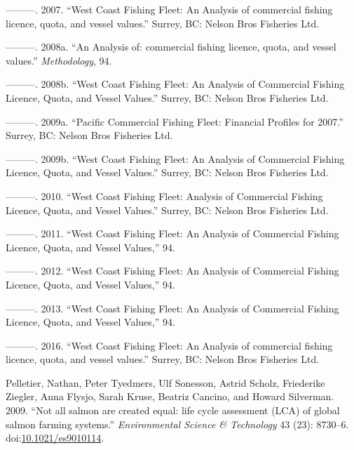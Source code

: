 \documentclass[]{article}
\theoremstyle{definition}
\theoremstyle{definition}
\theoremstyle{definition}
\theoremstyle{remark}
\begin{document}
\hypertarget{ref-Nelson2007}{}
---------. 2007. ``West Coast Fishing Fleet: An Analysis of commercial
fishing licence, quota, and vessel values.'' Surrey, BC: Nelson Bros
Fisheries Ltd.

\hypertarget{ref-Nelson2014}{}
---------. 2008a. ``An Analysis of: commercial fishing licence, quota,
and vessel values.'' \emph{Methodology}, 94.

\hypertarget{ref-Nelson2008}{}
---------. 2008b. ``West Coast Fishing Fleet: An Analysis of Commercial
Fishing Licence, Quota, and Vessel Values.'' Surrey, BC: Nelson Bros
Fisheries Ltd.

\hypertarget{ref-Nelson2009}{}
---------. 2009a. ``Pacific Commercial Fishing Fleet: Financial Profiles
for 2007.'' Surrey, BC: Nelson Bros Fisheries Ltd.

\hypertarget{ref-Nelson2009a}{}
---------. 2009b. ``West Coast Fishing Fleet: An Analysis of Commercial
Fishing Licence, Quota, and Vessel Values.'' Surrey, BC: Nelson Bros
Fisheries Ltd.

\hypertarget{ref-Nelson2010}{}
---------. 2010. ``West Coast Fishing Fleet: Analysis of Commercial
Fishing Licence, Quota, and Vessel Values.'' Surrey, BC: Nelson Bros
Fisheries Ltd.

\hypertarget{ref-Nelson2011a}{}
---------. 2011. ``West Coast Fishing Fleet: An Analysis of Commercial
Fishing Licence, Quota, and Vessel Values,'' 94.

\hypertarget{ref-Nelson2012}{}
---------. 2012. ``West Coast Fishing Fleet: An Analysis of Commercial
Fishing Licence, Quota, and Vessel Values,'' 94.

\hypertarget{ref-Nelson2013}{}
---------. 2013. ``West Coast Fishing Fleet: An Analysis of Commercial
Fishing Licence, Quota, and Vessel Values,'' 94.

\hypertarget{ref-Nelson2016}{}
---------. 2016. ``West Coast Fishing Fleet: An Analysis of commercial
fishing licence, quota, and vessel values.'' Surrey, BC: Nelson Bros
Fisheries Ltd.

\hypertarget{ref-Pelletier2009}{}
Pelletier, Nathan, Peter Tyedmers, Ulf Sonesson, Astrid Scholz,
Friederike Ziegler, Anna Flysjo, Sarah Kruse, Beatriz Cancino, and
Howard Silverman. 2009. ``Not all salmon are created equal: life cycle
assessment (LCA) of global salmon farming systems.'' \emph{Environmental
Science \& Technology} 43 (23): 8730--6.
doi:\href{https://doi.org/10.1021/es9010114}{10.1021/es9010114}.
\end{document}
